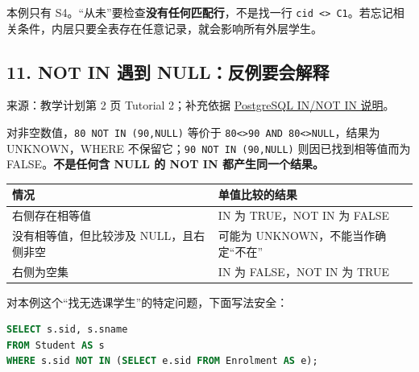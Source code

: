 本例只有 S4。``从未''要检查\textbf{没有任何匹配行}，不是找一行 \texttt{cid\ \textless{}\textgreater{}\ \textquotesingle{}C1\textquotesingle{}}。若忘记相关条件，内层只要全表存在任意记录，就会影响所有外层学生。

\subsection{11. NOT IN 遇到 NULL：反例要会解释}\label{06_sql_queries_zh-not-in-ux9047ux5230-nullux53cdux4f8bux8981ux4f1aux89e3ux91ca}

来源：教学计划第 2 页 Tutorial 2；补充依据 \href{https://www.postgresql.org/docs/18/functions-subquery.html\#FUNCTIONS-SUBQUERY-NOTIN}{PostgreSQL IN/NOT IN 说明}。

对非空数值，\texttt{80\ NOT\ IN\ (\allowbreak{}90,\allowbreak{}NULL)\allowbreak{}} 等价于 \texttt{80\textless{}\textgreater{}90\ AND\ 80\textless{}\textgreater{}NULL}，结果为 UNKNOWN，WHERE 不保留它；\texttt{90\ NOT\ IN\ (\allowbreak{}90,\allowbreak{}NULL)\allowbreak{}} 则因已找到相等值而为 FALSE。\textbf{不是任何含 NULL 的 NOT IN 都产生同一个结果。}

\begin{longtable}[]{@{}
  >{\raggedright\arraybackslash}p{}
  >{\raggedright\arraybackslash}p{}@{}}
\toprule\noalign{}
\begin{minipage}[b]{\linewidth}\raggedright
情况
\end{minipage} & \begin{minipage}[b]{\linewidth}\raggedright
单值比较的结果
\end{minipage} \\
\midrule\noalign{}
\endhead
\bottomrule\noalign{}
\endlastfoot
右侧存在相等值 & IN 为 TRUE，NOT IN 为 FALSE \\
没有相等值，但比较涉及 NULL，且右侧非空 & 可能为 UNKNOWN，不能当作确定``不在'' \\
右侧为空集 & IN 为 FALSE，NOT IN 为 TRUE \\
\end{longtable}

对本例这个``找无选课学生''的特定问题，下面写法安全：

\Needspace{75pt}
\begin{lstlisting}[language=SQL]
SELECT s.sid, s.sname
FROM Student AS s
WHERE s.sid NOT IN (SELECT e.sid FROM Enrolment AS e);
\end{lstlisting}

